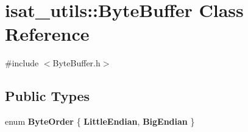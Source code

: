 \hypertarget{classisat__utils_1_1_byte_buffer}{}\section{isat\+\_\+utils\+:\+:Byte\+Buffer Class Reference}
\label{classisat__utils_1_1_byte_buffer}


{\ttfamily \#include $<$Byte\+Buffer.\+h$>$}

\subsection*{Public Types}
\begin{DoxyCompactItemize}
\item 
enum {\bfseries Byte\+Order} \{ {\bfseries Little\+Endian}, 
{\bfseries Big\+Endian}
 \}\hypertarget{classisat__utils_1_1_byte_buffer_a23d178f62dad62bad876f2350d3a552d}{}\label{classisat__utils_1_1_byte_buffer_a23d178f62dad62bad876f2350d3a552d}

\end{DoxyCompactItemize}
